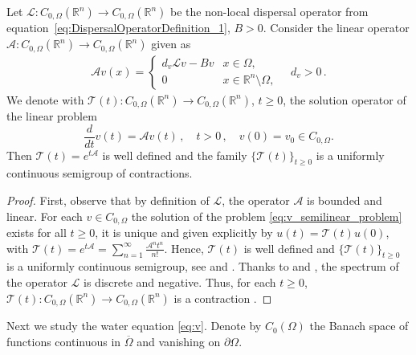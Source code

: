 \documentclass[review,onefignum,onetabnum]{SIAM-styles/siamart171218}
\begin{document}
\begin{lem} 
Let $\mathcal{L}:  C_{0, \Omega}(\mathbb{R}^n) \to C_{0, \Omega}(\mathbb{R}^n)$ be the non-local dispersal operator from equation~\eqref{eq:DispersalOperatorDefinition_1}, $B>0$.
Consider the linear operator $\mathcal{A}: C_{0, \Omega}(\mathbb{R}^n) \to C_{0, \Omega}(\mathbb{R}^n)$ given as
\begin{align}
    \label{EQ:A_OPERATOR_DEFINITION}
    \mathcal{A} v (x) =
    \begin{cases}
        d_v\mathcal{L}v - Bv &x \in \Omega, \\
        0 &x \in \mathbb{R}^n \setminus \Omega,
    \end{cases} \quad d_v >0 \,.
\end{align} 
We denote with $\mathcal{T}(t) : C_{0, \Omega} (\mathbb{R}^n) \to  C_{0, \Omega} (\mathbb{R}^n)$, $t \geq 0$, the solution operator of the linear problem 
    \begin{equation}
        \label{eq:v_semilinear_problem}
        \frac{d}{dt} v(t) = \mathcal{A} v (t) \,, \quad t > 0 \,, \quad  v(0) = v_0 \in C_{0, \Omega}.
    \end{equation}
Then $\mathcal{T}(t) = e^{t\mathcal{A}}$ is well defined and the family $\{\mathcal{T}(t)\}_{t \geq 0}$ is a uniformly continuous semigroup of contractions.
    \label{lem:A_SEMIGROUP_GENERATOR}
\end{lem}

\begin{proof} 
    First, observe that by definition of $\mathcal{L}$, the operator $\mathcal{A}$ is bounded and linear. For each $v \in C_{0, \Omega}$ the solution of the problem \eqref{eq:v_semilinear_problem} exists for all $t \geq 0$, it is unique and given explicitly by $u(t) = \mathcal{T}(t)u(0)$, with $\mathcal{T}(t) = e^{t\mathcal{A}} = \sum_{n=1}^\infty \frac{\mathcal{A}^n t^n}{n!}$. Hence, $\mathcal{T}(t)$ is well defined and $\{\mathcal{T}(t)\}_{t \geq 0}$ is a uniformly continuous semigroup, see \cite[Proposition 1.2.2]{cazenave1998introduction} and \cite[Theorem 1.2]{Pazy}. Thanks to  \cite[Proposition 3.2]{ChasseigneChavesRossi2006} and \cite[Theorem 2.1]{Tadej2025}, the spectrum of the operator $\mathcal{L}$ is discrete and negative. Thus, for each $t \geq 0$, $\mathcal{T}(t):  C_{0, \Omega}(\mathbb{R}^n) \rightarrow C_{0, \Omega}(\mathbb{R}^n)$ is a contraction \cite[Proposition V.1.7]{EngelNagel2000}.    
\end{proof}

Next we study the water equation \eqref{eq:v}. Denote by $C_0(\Omega)$ the Banach space of functions continuous in $\overline{\Omega}$ and vanishing on $\partial\Omega$.
\end{document}
